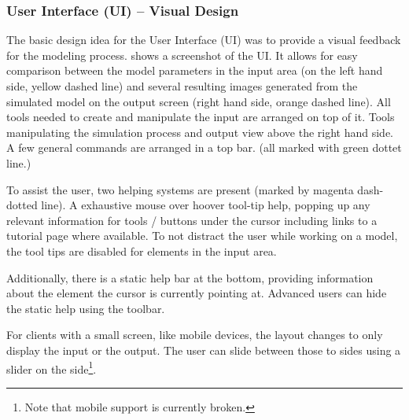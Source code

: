\subsubsection{User Interface (UI) -- Visual Design}
\label{sec:ui-vis}


The basic design idea for the User Interface (UI) was to provide a visual feedback for the modeling process.
 shows a screenshot of the UI.
It allows for easy comparison between the model parameters in the input area (on the left hand side, yellow dashed line) and several resulting images generated from the simulated model on the output screen (right hand side, orange dashed line).
All tools needed to create and manipulate the input are arranged on top of it.
Tools manipulating the simulation process and output view above the right hand side.
A few general commands are arranged in a top bar. (all marked with green dottet line.)

To assist the user, two helping systems are present (marked by magenta dash-dotted line).
A exhaustive mouse over hoover tool-tip help, popping up any relevant information for tools / buttons under the cursor including links to a tutorial page where available.
To not distract the user while working on a model, the tool tips are disabled for elements in the input area.

Additionally, there is a static help bar at the bottom, providing information about the element the cursor is currently pointing at.
Advanced users can hide the static help using the toolbar.

For clients with a small screen, like mobile devices, the layout changes to only display the input or the output.
The user can slide between those to sides using a slider on the side\footnote{Note that mobile support is currently broken.}.

